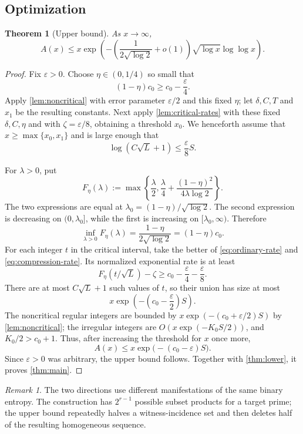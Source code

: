 \documentclass[11pt]{amsart}
\newtheorem{theorem}{Theorem}[section]
\theoremstyle{definition}
\theoremstyle{remark}
\newtheorem{remark}[remark]{Remark}
\numberwithin{equation}{section}
\newcommand{\eps}{\varepsilon}
\begin{document}
\subsection{Optimization}

\begin{theorem}[Upper bound]\label{thm:upper}
As $x\to\infty$,
\[
 A(x)\le x\exp\!\left(-\left(\frac1{2\sqrt{\log 2}}+o(1)\right)
 \sqrt{\log x}\log\log x\right).
\]
\end{theorem}

\begin{proof}
Fix $\eps>0$.  Choose $\eta\in(0,1/4)$ so small that
\[
 (1-\eta)c_0\ge c_0-\frac{\eps}{4}.
\]
Apply \cref{lem:noncritical} with error parameter $\eps/2$ and this fixed
$\eta$; let $\delta,C,T$ and $x_1$ be the resulting constants.  Next
apply \cref{lem:critical-rates} with these fixed $\delta,C,\eta$ and with
$\zeta=\eps/8$, obtaining a threshold $x_0$.  We henceforth assume that
$x\ge\max\{x_0,x_1\}$ and is large enough that
\[
 \log(C\sqrt L+1)\le\frac{\eps}{8}S.
\]

For $\lambda>0$, put
\[
 F_\eta(\lambda):=\max\left\{
 \frac\lambda2,
 \frac\lambda4+\frac{(1-\eta)^2}{4\lambda\log 2}
 \right\}.
\]
The two expressions are equal at
$\lambda_0=(1-\eta)/\sqrt{\log 2}$.  The second expression is decreasing
on $(0,\lambda_0]$, while the first is increasing on
$[\lambda_0,\infty)$.  Therefore
\begin{equation}\label{eq:Feta-min}
 \inf_{\lambda>0}F_\eta(\lambda)
 =\frac{1-\eta}{2\sqrt{\log 2}}
 =(1-\eta)c_0.
\end{equation}
For each integer $t$ in the critical interval, take the better of
\eqref{eq:ordinary-rate} and \eqref{eq:compression-rate}.  Its normalized
exponential rate is at least
\[
 F_\eta(t/\sqrt L)-\zeta
 \ge c_0-\frac{\eps}{4}-\frac{\eps}{8}.
\]
There are at most $C\sqrt L+1$ such values of $t$, so their union has size
at most
\[
 x\exp\!\left(-\left(c_0-\frac{\eps}{2}\right)S\right).
\]
The noncritical regular integers are bounded by
$x\exp(-(c_0+\eps/2)S)$ by \cref{lem:noncritical}; the irregular integers
are $O(x\exp(-K_0S/2))$, and $K_0/2>c_0+1$.  Thus, after increasing the
threshold for $x$ once more,
\[
 A(x)\le x\exp\bigl(-(c_0-\eps)S\bigr).
\]
Since $\eps>0$ was arbitrary, the upper bound follows.  Together with
\cref{thm:lower}, it proves \cref{thm:main}.
\end{proof}

\begin{remark}
The two directions use different manifestations of the same binary
entropy.  The construction has $2^{r-1}$ possible subset products for a
target prime; the upper bound repeatedly halves a witness-incidence set
and then deletes half of the resulting homogeneous sequence.
\end{remark}
\end{document}
